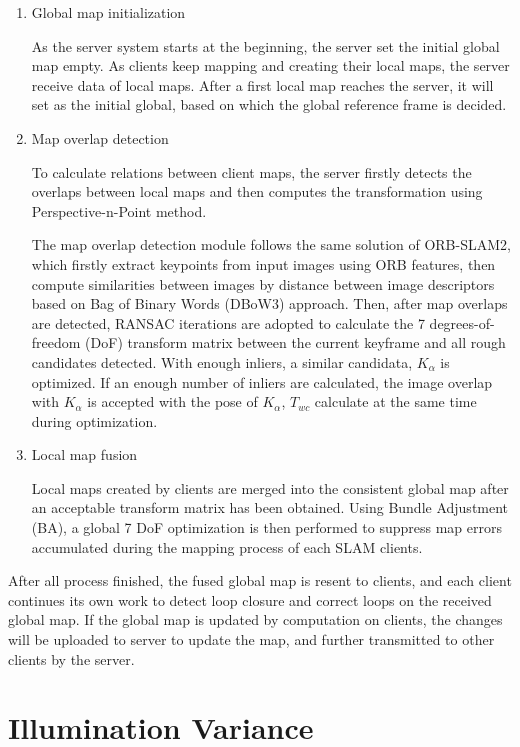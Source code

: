 \begin{enumerate}[1.]
	\item Global map initialization
	
	As the server system starts at the beginning, the server set the initial global map empty. As clients keep mapping and creating their local maps, the server receive data of local maps. After a first local map reaches the server, it will set as the initial global, based on which the global reference frame is decided.
	
	\item Map overlap detection
	
	To calculate relations between client maps, the server firstly detects the overlaps between local maps and then computes the transformation using Perspective-n-Point method.
	
	The map overlap detection module follows the same solution of ORB-SLAM2, which firstly extract keypoints from input images using ORB features, then compute similarities between images by distance between image descriptors based on Bag of Binary Words (DBoW3) approach.
	Then, after map overlaps are detected, RANSAC iterations are adopted to calculate the 7 degrees-of-freedom (DoF) transform matrix between the current keyframe and all rough candidates detected. With enough inliers, a similar candidata, $K_{\alpha}$ is optimized. If an enough number of inliers are calculated, the image overlap with $K_\alpha$ is accepted with the pose of $K_\alpha$, $T_{wc}$ calculate at the same time during optimization.
	
	\item Local map fusion 
	
	Local maps created by clients are merged into the consistent global map after an acceptable transform matrix has been obtained. Using Bundle Adjustment (BA), a global 7 DoF optimization is then performed to suppress map errors accumulated during the mapping process of each SLAM clients.
\end{enumerate}

After all process finished, the fused global map is resent to clients, and each client continues its own work to detect loop closure and correct loops on the received global map. If the global map is updated by computation on clients, the changes will be uploaded to server to update the map, and further transmitted to other clients by the server.

\section{Illumination Variance}

